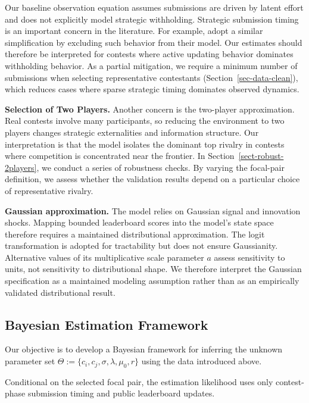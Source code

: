 \documentclass[mnsc]{informs3}
\begin{document}
Our baseline observation equation assumes submissions are driven by latent effort and does not explicitly model strategic withholding.
Strategic submission timing is an important concern in the literature.
For example, \citet{lemus2021dynamic} adopt a similar simplification by excluding such behavior from their model.
Our estimates should therefore be interpreted for contests where active updating behavior dominates withholding behavior.
As a partial mitigation, we require a minimum number of submissions when selecting representative contestants (Section~\ref{sec-data-clean}), which reduces cases where sparse strategic timing dominates observed dynamics.


\textbf{Selection of Two Players.}
Another concern is the two-player approximation.
Real contests involve many participants, so reducing the environment to two players changes strategic externalities and information structure.
Our interpretation is that the model isolates the dominant top rivalry in contests where competition is concentrated near the frontier.
In Section~\ref{sect-robust-2players}, we conduct a series of robustness checks.
By varying the focal-pair definition, we assess whether the validation results depend on a particular choice of representative rivalry.

\textbf{Gaussian approximation.}
The model relies on Gaussian signal and innovation shocks. Mapping bounded leaderboard scores into the model's state space therefore requires a maintained distributional approximation. The logit transformation is adopted for tractability but does not ensure Gaussianity. Alternative values of its multiplicative scale parameter $a$ assess sensitivity to units, not sensitivity to distributional shape. We therefore interpret the Gaussian specification as a maintained modeling assumption rather than as an empirically validated distributional result.



\subsection{Bayesian Estimation Framework}

Our objective is to develop a Bayesian framework for inferring the unknown parameter set $\Theta := \{ c_i, c_j, \sigma, \lambda, \mu_0,r \}$ using the data introduced above.

Conditional on the selected focal pair, the estimation likelihood uses only contest-phase submission timing and public leaderboard updates.
\end{document}
